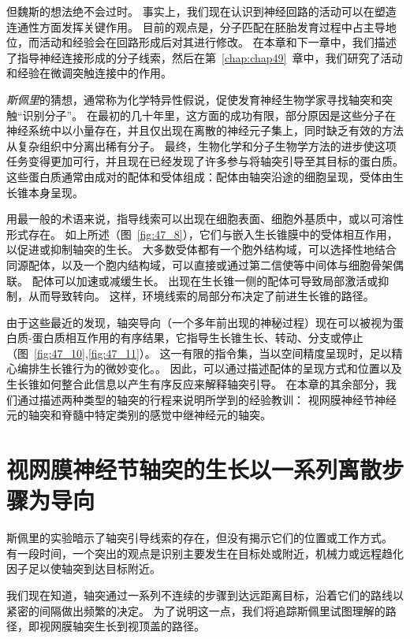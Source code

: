 但魏斯的想法绝不会过时。
事实上，我们现在认识到神经回路的活动可以在塑造连通性方面发挥关键作用。
目前的观点是，分子匹配在胚胎发育过程中占主导地位，而活动和经验会在回路形成后对其进行修改。
在本章和下一章中，我们描述了指导神经连接形成的分子线索，然后在第~\ref{chap:chap49}~章中，我们研究了活动和经验在微调突触连接中的作用。


\textit{斯佩里}的猜想，通常称为化学特异性假说，促使发育神经生物学家寻找轴突和突触“识别分子”。
在最初的几十年里，这方面的成功有限，部分原因是这些分子在神经系统中以小量存在，并且仅出现在离散的神经元子集上，同时缺乏有效的方法从复杂组织中分离出稀有分子。
最终，生物化学和分子生物学方法的进步使这项任务变得更加可行，并且现在已经发现了许多参与将轴突引导至其目标的蛋白质。
这些蛋白质通常由成对的配体和受体组成：配体由轴突沿途的细胞呈现，受体由生长锥本身呈现。


用最一般的术语来说，指导线索可以出现在细胞表面、细胞外基质中，或以可溶性形式存在。
如上所述（图~\ref{fig:47_8}），它们与嵌入生长锥膜中的受体相互作用，以促进或抑制轴突的生长。
大多数受体都有一个胞外结构域，可以选择性地结合同源配体，以及一个胞内结构域，可以直接或通过第二信使等中间体与细胞骨架偶联。
配体可以加速或减缓生长。
出现在生长锥一侧的配体可导致局部激活或抑制，从而导致转向。
这样，环境线索的局部分布决定了前进生长锥的路径。


由于这些最近的发现，轴突导向（一个多年前出现的神秘过程）现在可以被视为蛋白质-蛋白质相互作用的有序结果，它指导生长锥生长、转动、分支或停止（图~\ref{fig:47_10},\ref{fig:47_11}）。
这一有限的指令集，当以空间精度呈现时，足以精心编排生长锥行为的微妙变化。。
因此，可以通过描述配体的呈现方式和位置以及生长锥如何整合此信息以产生有序反应来解释轴突引导。
在本章的其余部分，我们通过描述两种类型的轴突的行程来说明所学到的经验教训：
视网膜神经节神经元的轴突和脊髓中特定类别的感觉中继神经元的轴突。



\section{视网膜神经节轴突的生长以一系列离散步骤为导向}

斯佩里的实验暗示了轴突引导线索的存在，但没有揭示它们的位置或工作方式。
有一段时间，一个突出的观点是识别主要发生在目标处或附近，机械力或远程趋化因子足以使轴突到达目标附近。


我们现在知道，轴突通过一系列不连续的步骤到达远距离目标，沿着它们的路线以紧密的间隔做出频繁的决定。
为了说明这一点，我们将追踪斯佩里试图理解的路径，即视网膜轴突生长到视顶盖的路径。



